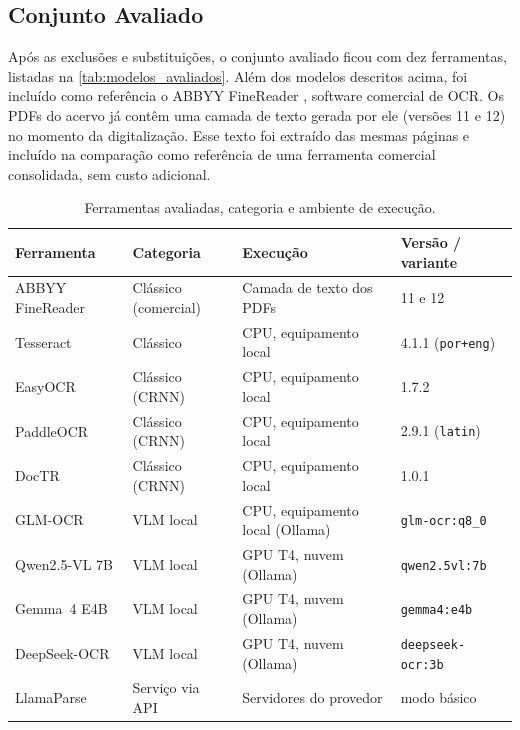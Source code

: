 \documentclass[noabntexcite,oneside]{ufsc-thesis-rn46-2019}
\begin{document}
\subsection{Conjunto Avaliado}

Após as exclusões e substituições, o conjunto avaliado ficou com dez ferramentas,
listadas na \autoref{tab:modelos_avaliados}. Além dos modelos descritos acima, foi
incluído como referência o ABBYY FineReader \cite{abbyy_finereader}, software comercial de OCR. Os PDFs
do acervo já contêm uma camada de texto gerada por ele (versões 11 e 12) no momento da
digitalização. Esse texto foi extraído das mesmas páginas e incluído na comparação como
referência de uma ferramenta comercial consolidada, sem custo adicional.

\begin{table}[htb]
\centering
\caption{Ferramentas avaliadas, categoria e ambiente de execução.}
\label{tab:modelos_avaliados}
\renewcommand{\arraystretch}{1.3}
{\small
\begin{tabular}{L{3.6cm} L{3.0cm} L{4.0cm} L{3.4cm}}
\hline
\textbf{Ferramenta} & \textbf{Categoria} & \textbf{Execução} & \textbf{Versão / variante} \\
\hline
ABBYY FineReader & Clássico (comercial) & Camada de texto dos PDFs & 11 e 12 \\
Tesseract & Clássico & CPU, equipamento local & 4.1.1 (\texttt{por+eng}) \\
EasyOCR & Clássico (CRNN) & CPU, equipamento local & 1.7.2 \\
PaddleOCR & Clássico (CRNN) & CPU, equipamento local & 2.9.1 (\texttt{latin}) \\
DocTR & Clássico (CRNN) & CPU, equipamento local & 1.0.1 \\
\hline
GLM-OCR & VLM local & CPU, equipamento local (Ollama) & \texttt{glm-ocr:q8\_0} \\
Qwen2.5-VL 7B & VLM local & GPU T4, nuvem (Ollama) & \texttt{qwen2.5vl:7b} \\
Gemma~4 E4B & VLM local & GPU T4, nuvem (Ollama) & \texttt{gemma4:e4b} \\
DeepSeek-OCR & VLM local & GPU T4, nuvem (Ollama) & \texttt{deepseek-ocr:3b} \\
\hline
LlamaParse & Serviço via API & Servidores do provedor & modo básico \\

\hline
\end{tabular}
}

\end{table}
\end{document}
